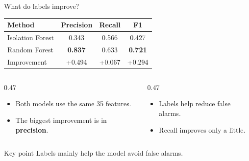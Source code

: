\documentclass[aspectratio=169,10pt]{beamer}
\newcommand{\good}[1]{\textbf{#1}}
\newcommand{\keypoint}[1]{%
  \vspace{0.4em}
  \begin{alertblock}{Key point}
    #1
  \end{alertblock}
}
\begin{document}
\begin{frame}{What do labels improve?}

  \centering

  \begin{tabular}{lccc}
    \toprule
    Method & Precision & Recall & F1 \\
    \midrule
    Isolation Forest & 0.343 & 0.566 & 0.427 \\
    Random Forest    & \good{0.837} & 0.633 & \good{0.721} \\
    \midrule
    Improvement      & \alert{+0.494} & +0.067 & +0.294 \\
    \bottomrule
  \end{tabular}

  \vspace{1.2em}

  \begin{columns}[T,onlytextwidth]

    \begin{column}{0.47\textwidth}
      \begin{itemize}
        \item Both models use the same 35 features.
        \item The biggest improvement is in \textbf{precision}.
      \end{itemize}
    \end{column}

    \begin{column}{0.47\textwidth}
      \begin{itemize}
        \item Labels help reduce false alarms.
        \item Recall improves only a little.
      \end{itemize}
    \end{column}

  \end{columns}

  \vfill

  \keypoint{\vspace{0.1cm}
  Labels mainly help the model avoid false alarms.}

\end{frame}
\end{document}
